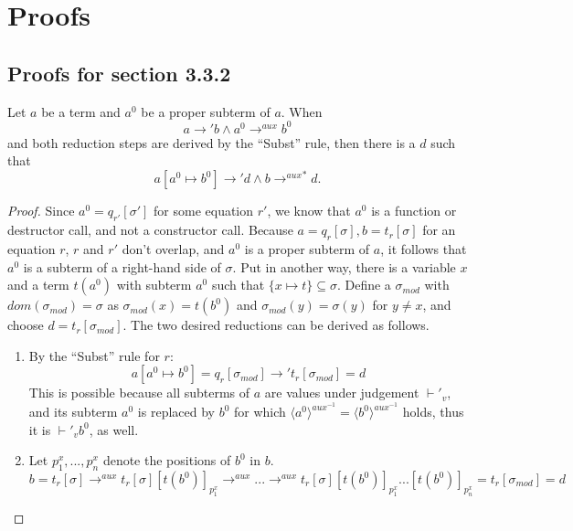 \chapter{Proofs}

\section{Proofs for section 3.3.2}

\begin{lemma}
\label{lem:app1}
Let $a$ be a term and $a^0$ be a proper subterm of $a$. When
\[
a \longrightarrow' b \land a^0 \longrightarrow^{aux} b^0
\]
and both reduction steps are derived by the ``Subst'' rule, then there is a $d$ such that
\[
a[a^0 \mapsto b^0] \longrightarrow' d \land b {\longrightarrow^{aux}}^* d.
\]

\begin{proof}
Since $a^0 = q_{r'}[\sigma']$ for some equation $r'$, we know that $a^0$ is a function or destructor call, and not a constructor call. Because $a = q_r[\sigma], b = t_r[\sigma]$ for an equation $r$, $r$ and $r'$ don't overlap, and $a^0$ is a proper subterm of $a$, it follows that $a^0$ is a subterm of a right-hand side of $\sigma$. Put in another way, there is a variable $x$ and a term $t(a^0)$ with subterm $a^0$ such that $\{x \mapsto t\} \subseteq \sigma$. Define a $\sigma_{mod}$ with $dom(\sigma_{mod}) = \sigma$ as $\sigma_{mod}(x) = t(b^0)$ and $\sigma_{mod}(y) = \sigma(y)$ for $y \neq x$, and choose $d = t_r[\sigma_{mod}]$. The two desired reductions can be derived as follows.
\begin{enumerate}
\item By the ``Subst'' rule for $r$:
\[
a[a^0 \mapsto b^0] = q_r[\sigma_{mod}] \longrightarrow' t_r[\sigma_{mod}] = d
\]
This is possible because all subterms of $a$ are values under judgement $\vdash'_v$, and its subterm $a^0$ is replaced by $b^0$ for which $\langle a^0 \rangle^{aux^{-1}} = \langle b^0 \rangle^{aux^{-1}}$ holds, thus it is $\vdash'_v b^0$, as well.

\item Let $p^x_1, ..., p^x_n$ denote the positions of $b^0$ in $b$.
\[
b = t_r[\sigma] \longrightarrow^{aux} t_r[\sigma][t(b^0)]_{p^x_1} \longrightarrow^{aux} ... \longrightarrow^{aux} t_r[\sigma][t(b^0)]_{p^x_1}...[t(b^0)]_{p^x_n} = t_r[\sigma_{mod}] = d
\]
\end{enumerate}
\end{proof}
\end{lemma}

